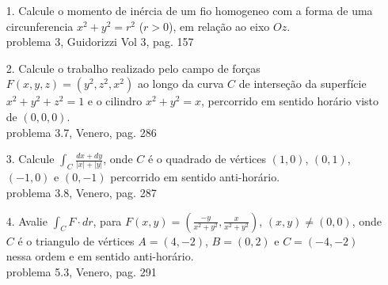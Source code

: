 \begin{itemize}
	\item[1.] Calcule o momento de inércia de um fio homogeneo com a forma de uma circunferencia $x^{2}+y^{2}=r^{2}$ ($r>0$), em relação ao eixo $Oz$.\\
	problema 3, Guidorizzi Vol 3, pag. 157	
\end{itemize}
\begin{itemize}
	\item[2.] Calcule o trabalho realizado pelo campo de forças $F(x,y,z)=(y^{2},z^{2},x^{2})$ ao longo da curva $C$ de interseção da superfície $x^{2}+y^{2}+z^{2}=1$ e o cilindro $x^{2}+y^{2}=x$, percorrido em sentido horário visto de $(0,0,0)$.\\
	problema 3.7, Venero, pag. 286
\end{itemize}
\begin{itemize}
	\item[3.] Calcule $\int_{C} \frac{dx+dy}{|x|+|y|}$, onde $C$ é o quadrado de vértices $(1,0)$, $(0,1)$, $(-1,0)$ e $(0,-1)$ percorrido em sentido anti-horário.\\
	problema 3.8, Venero, pag. 287
\end{itemize}
\begin{itemize}
	\item[4.] Avalie $\int_{C} F\cdot dr$, para $F(x,y)=(\frac{-y}{x^{2}+y^{2}},\frac{x}{x^{2}+y^{2}})$, $(x,y)\neq (0,0)$, onde $C$ é o triangulo de vértices $A=(4,-2)$, $B=(0,2)$ e $C=(-4,-2)$ nessa ordem e em sentido anti-horário.\\
	problema 5.3, Venero, pag. 291
\end{itemize}

